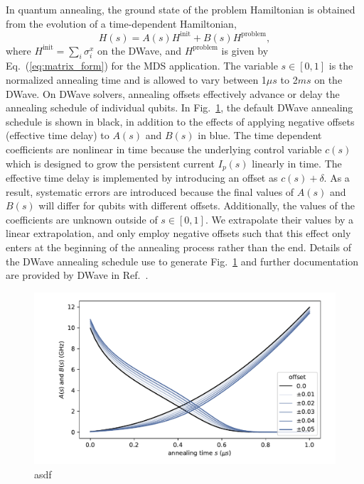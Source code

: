 \documentclass[prd,twocolumn,tightenlines,preprintnumbers,showpacs,superscriptaddress,notitlepage,nofootinbib,eqsecnum,
floatfix,longbibliography,aps,10pt]{revtex4-2}
\begin{document}
In quantum annealing, the ground state of the problem Hamiltonian is obtained from the evolution of a time-dependent Hamiltonian,
\begin{equation}
H(s) = A(s) H^{\textrm{init}} + B(s) H^{\textrm{problem}}, \label{eq:tdhamiltonian}
\end{equation}
where $H^\textrm{init}=\sum_i\sigma^x_i$ on the DWave, and $H^\textrm{problem}$ is given by Eq.~(\ref{eq:matrix_form}) for the MDS application. The variable $s\in [0, 1]$ is the normalized annealing time and is allowed to vary between 1$\mu s$ to 2$ms$ on the DWave. On DWave solvers, annealing offsets effectively advance or delay the annealing schedule of individual qubits. In Fig.~\ref{fig:anneal_schedule}, the default DWave annealing schedule is shown in black, in addition to the effects of applying negative offsets (effective time delay) to $A(s)$ and $B(s)$ in blue. The time dependent coefficients are nonlinear in time because the underlying control variable $c(s)$ which is designed to grow the persistent current $I_p(s)$ linearly in time. The effective time delay is implemented by introducing an offset as $c(s) + \delta$.  As a result, systematic errors are introduced because the final values of $A(s)$ and $B(s)$ will differ for qubits with different offsets. Additionally, the values of the coefficients are unknown outside of $s\in [0, 1]$. We extrapolate their values by a linear extrapolation, and only employ negative offsets such that this effect only enters at the beginning of the annealing process rather than the end. Details of the DWave annealing schedule use to generate Fig.~\ref{fig:anneal_schedule} and further documentation are provided by DWave in Ref.~\cite{dwave_as, dwave_as_docu}.

\begin{figure}[b]
	\centering
	\includegraphics[width=\columnwidth]{./new_figures/anneal_schedule.pdf}
	\caption{asdf}
	\label{fig:anneal_schedule}
\end{figure}
\end{document}
